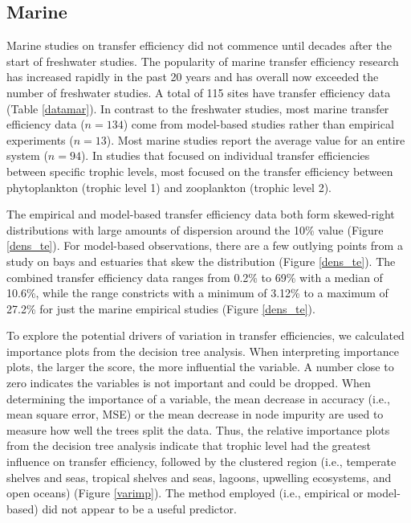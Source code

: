 \documentclass[oneside,12pt,final]{sty/ucthesis-CA2012}
\begin{document}
\begin{mainmatter}
\subsection{Marine}
Marine studies on transfer efficiency did not commence until decades after the start of freshwater studies. The popularity of marine transfer efficiency research has increased rapidly in the past 20 years and has overall now exceeded the number of freshwater studies. A total of 115 sites have transfer efficiency data (Table \ref{datamar}). In contrast to the freshwater studies, most marine transfer efficiency data ($n=134$) come from model-based studies rather than empirical experiments ($n=13$). Most marine studies report the average value for an entire system ($n=94$). In studies that focused on individual transfer efficiencies between specific trophic levels, most focused on the transfer efficiency between phytoplankton (trophic level 1) and zooplankton (trophic level 2).

\vspace{5mm}

The empirical and model-based transfer efficiency data both form skewed-right distributions with large amounts of dispersion around the 10\% value (Figure \ref{dens_te}). For model-based observations, there are a few outlying points from a study on bays and estuaries that skew the distribution (Figure \ref{dens_te}). The combined transfer efficiency data ranges from 0.2\% to 69\% with a median of 10.6\%, while the range constricts with a minimum of 3.12\% to a maximum of 27.2\% for just the marine empirical studies (Figure \ref{dens_te}). 

\vspace{5mm}

To explore the potential drivers of variation in transfer efficiencies, we calculated importance plots from the decision tree analysis. When interpreting importance plots, the larger the score, the more influential the variable. A number close to zero indicates the variables is not important and could be dropped. When determining the importance of a variable, the mean decrease in accuracy (i.e., mean square error, MSE) or the mean decrease in node impurity are used to measure how well the trees split the data. Thus, the relative importance plots from the decision tree analysis indicate that trophic level had the greatest influence on transfer efficiency, followed by the clustered region (i.e., temperate shelves and seas, tropical shelves and seas, lagoons, upwelling ecosystems, and open oceans) (Figure \ref{varimp}). The method employed (i.e., empirical or model-based) did not appear to be a useful predictor.  


\end{mainmatter}
\end{document}
